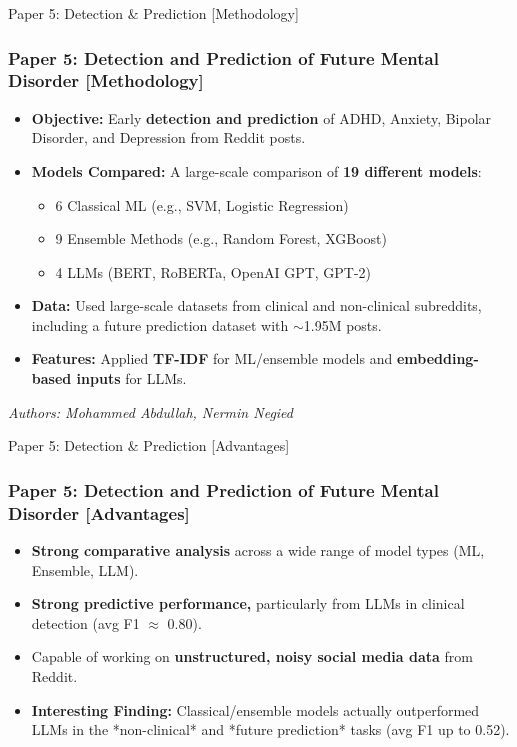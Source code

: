 \documentclass[11pt]{beamer}
\begin{document}
\begin{frame}{Paper 5: Detection \& Prediction [Methodology]}
\frametitle{Paper 5: Detection and Prediction of Future Mental Disorder [Methodology]}
\begin{itemize}
    \item \textbf{Objective:} Early \textbf{detection and prediction} of ADHD, Anxiety, Bipolar Disorder, and Depression from Reddit posts.
    \item \textbf{Models Compared:} A large-scale comparison of \textbf{19 different models}:
    \begin{itemize}
        \item 6 Classical ML (e.g., SVM, Logistic Regression)
        \item 9 Ensemble Methods (e.g., Random Forest, XGBoost)
        \item 4 LLMs (BERT, RoBERTa, OpenAI GPT, GPT-2)
    \end{itemize}
    \item \textbf{Data:} Used large-scale datasets from clinical and non-clinical subreddits, including a future prediction dataset with $\sim$1.95M posts.
    \item \textbf{Features:} Applied \textbf{TF-IDF} for ML/ensemble models and \textbf{embedding-based inputs} for LLMs.
\end{itemize}
\vfill
\small{\textit{Authors: Mohammed Abdullah, Nermin Negied}}
\end{frame}

\begin{frame}{Paper 5: Detection \& Prediction [Advantages]}
\frametitle{Paper 5: Detection and Prediction of Future Mental Disorder [Advantages]}
\begin{itemize}
    \item \textbf{Strong comparative analysis} across a wide range of model types (ML, Ensemble, LLM).
    \item \textbf{Strong predictive performance,} particularly from LLMs in clinical detection (avg F1 $\approx$ 0.80).
    \item Capable of working on \textbf{unstructured, noisy social media data} from Reddit.
    \item \textbf{Interesting Finding:} Classical/ensemble models actually outperformed LLMs in the *non-clinical* and *future prediction* tasks (avg F1 up to 0.52).
\end{itemize}
\end{frame}
\end{document}
